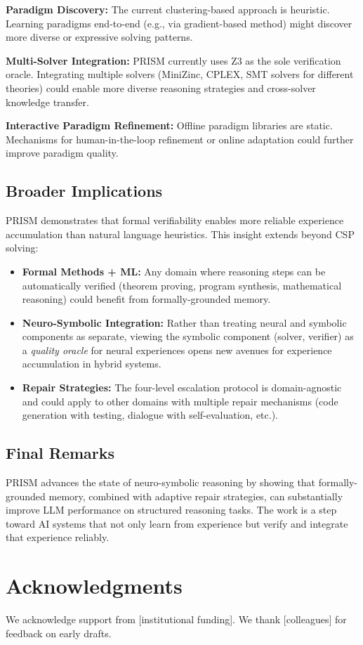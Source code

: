 \textbf{Paradigm Discovery:} The current clustering-based approach is heuristic. Learning paradigms end-to-end (e.g., via gradient-based method) might discover more diverse or expressive solving patterns.

\textbf{Multi-Solver Integration:} PRISM currently uses Z3 as the sole verification oracle. Integrating multiple solvers (MiniZinc, CPLEX, SMT solvers for different theories) could enable more diverse reasoning strategies and cross-solver knowledge transfer.

\textbf{Interactive Paradigm Refinement:} Offline paradigm libraries are static. Mechanisms for human-in-the-loop refinement or online adaptation could further improve paradigm quality.

\subsection{Broader Implications}

PRISM demonstrates that formal verifiability enables more reliable experience accumulation than natural language heuristics. This insight extends beyond CSP solving:

\begin{itemize}
    \item \textbf{Formal Methods + ML:} Any domain where reasoning steps can be automatically verified (theorem proving, program synthesis, mathematical reasoning) could benefit from formally-grounded memory.

    \item \textbf{Neuro-Symbolic Integration:} Rather than treating neural and symbolic components as separate, viewing the symbolic component (solver, verifier) as a \textit{quality oracle} for neural experiences opens new avenues for experience accumulation in hybrid systems.

    \item \textbf{Repair Strategies:} The four-level escalation protocol is domain-agnostic and could apply to other domains with multiple repair mechanisms (code generation with testing, dialogue with self-evaluation, etc.).
\end{itemize}

\subsection{Final Remarks}

PRISM advances the state of neuro-symbolic reasoning by showing that formally-grounded memory, combined with adaptive repair strategies, can substantially improve LLM performance on structured reasoning tasks. The work is a step toward AI systems that not only learn from experience but verify and integrate that experience reliably.

\section*{Acknowledgments}

We acknowledge support from [institutional funding]. We thank [colleagues] for feedback on early drafts.
